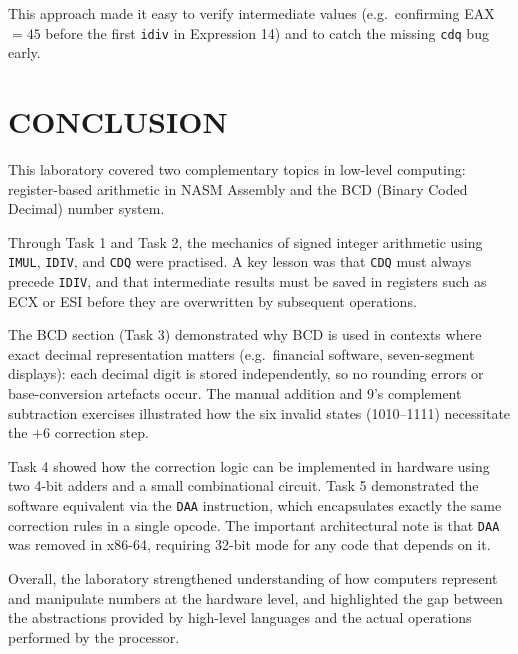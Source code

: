\documentclass[12pt,a4paper]{article}
\begin{document}
This approach made it easy to verify intermediate values (e.g.\ confirming EAX $= 45$
before the first \texttt{idiv} in Expression 14) and to catch the missing \texttt{cdq}
bug early.

\newpage
\section{CONCLUSION}

This laboratory covered two complementary topics in low-level computing: register-based
arithmetic in NASM Assembly and the BCD (Binary Coded Decimal) number system.

Through Task 1 and Task 2, the mechanics of signed integer arithmetic using \texttt{IMUL},
\texttt{IDIV}, and \texttt{CDQ} were practised.  A key lesson was that \texttt{CDQ} must
always precede \texttt{IDIV}, and that intermediate results must be saved in registers
such as ECX or ESI before they are overwritten by subsequent operations.

The BCD section (Task 3) demonstrated why BCD is used in contexts where exact decimal
representation matters (e.g.\ financial software, seven-segment displays): each decimal
digit is stored independently, so no rounding errors or base-conversion artefacts occur.
The manual addition and 9's complement subtraction exercises illustrated how the six
invalid states (1010--1111) necessitate the $+6$ correction step.

Task 4 showed how the correction logic can be implemented in hardware using two 4-bit
adders and a small combinational circuit.  Task 5 demonstrated the software equivalent
via the \texttt{DAA} instruction, which encapsulates exactly the same correction rules in
a single opcode.  The important architectural note is that \texttt{DAA} was removed in
x86-64, requiring 32-bit mode for any code that depends on it.

Overall, the laboratory strengthened understanding of how computers represent and
manipulate numbers at the hardware level, and highlighted the gap between the
abstractions provided by high-level languages and the actual operations performed by the
processor.
\end{document}
